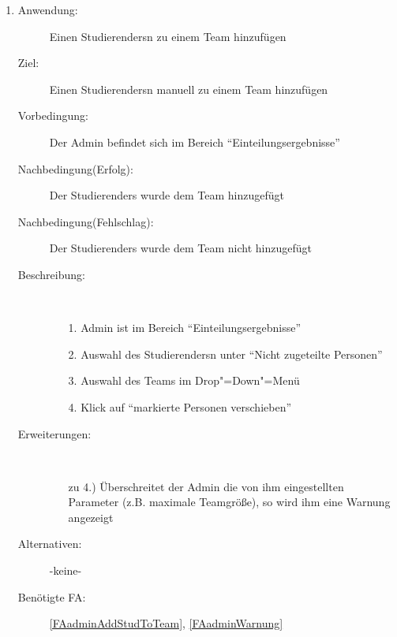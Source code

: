 \documentclass[parskip=full]{scrartcl}
\newcommand{\swtLabel}[1]{\textbf{/#1\arabic*0/}}
\begin{document}
\begin{enumerate} [label=\swtLabel{A}]
  \item \label{UCadminAddStudToTeam}
    \begin{description}
  	\item[Anwendung:] Einen \glspl{Studierender}n zu einem \gls{Team} hinzufügen
  	\item[Ziel:] Einen \glspl{Studierender}n manuell zu einem \gls{Team} hinzufügen
  	\item[Vorbedingung:] Der \gls{Admin} befindet sich im Bereich
  	\enquote{\gls{Einteilung}sergebnisse}
  	\item[Nachbedingung(Erfolg):] Der \glspl{Studierender} wurde dem \gls{Team} hinzugefügt
  	\item[Nachbedingung(Fehlschlag):] Der \glspl{Studierender} wurde dem \gls{Team} nicht
  	hinzugefügt
  	\item[Beschreibung:]~
  	\begin{enumerate}
  	  \item[1.] \gls{Admin} ist im Bereich \enquote{\gls{Einteilung}sergebnisse}
      \item[2.] Auswahl des \glspl{Studierender}n unter \enquote{Nicht zugeteilte
      Personen}
      \item[3.] Auswahl des \glspl{Team} im Drop"=Down"=Menü
      \item[4.] Klick auf \enquote{markierte Personen verschieben}
  	\end{enumerate}
  	\item[Erweiterungen:]~
  	\begin{enumerate}
  	  \item [zu 4.)] Überschreitet der \gls{Admin} die von ihm eingestellten
  	  Parameter (z.B. maximale \gls{Team}größe), so wird ihm eine Warnung angezeigt
  	\end{enumerate}  
  	\item[Alternativen:] -keine-
  	\item[Benötigte FA:] \ref{FAadminAddStudToTeam}, \ref{FAadminWarnung}
  \end{description}
  

\end{enumerate}
\end{document}
